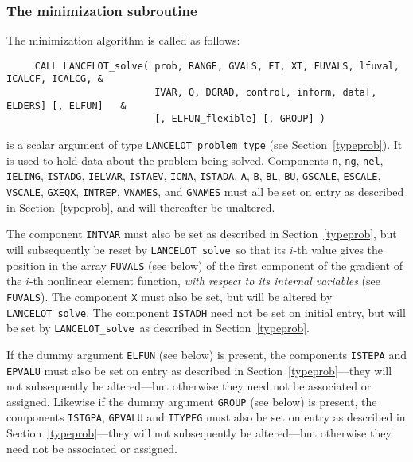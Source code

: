 \documentclass{galahad}
\newcommand{\fullpackagename}{LANC\-E\-LOT}
\newcommand{\solver}{{\tt \fullpackagename\_solve}}
\begin{document}

\subsubsection{The minimization subroutine\label{min}}
The minimization algorithm is called as follows:
\hskip0.5in
\def\baselinestretch{0.8} {\tt \begin{verbatim}
     CALL LANCELOT_solve( prob, RANGE, GVALS, FT, XT, FUVALS, lfuval, ICALCF, ICALCG, &
                          IVAR, Q, DGRAD, control, inform, data[, ELDERS] [, ELFUN]   &
                          [, ELFUN_flexible] [, GROUP] )
\end{verbatim}}
\def\baselinestretch{1.0}

\begin{description}

 is a scalar \intentinout argument of type
{\tt \fullpackagename\_problem\_type}
(see Section~\ref{typeprob}).
It is used to hold data about the problem being solved.
Components
{\tt n},
{\tt ng},
{\tt nel},
{\tt IELING},
{\tt ISTADG},
{\tt IELVAR},
{\tt ISTAEV},
{\tt ICNA},
{\tt ISTADA},
{\tt A},
{\tt B},
{\tt BL},
{\tt BU},
{\tt GSCALE},
{\tt ESCALE},
{\tt VSCALE},
{\tt GXEQX},
{\tt INTREP},
{\tt VNAMES}, and
{\tt GNAMES}
must all be set on entry as described in Section~\ref{typeprob}, and
will thereafter be unaltered.

The component {\tt INTVAR} must also be set as
described in Section~\ref{typeprob}, but will subsequently be reset by \solver\
so that its $i$-th value
gives the position in the array {\tt FUVALS} (see below)
of the first component of
the gradient of the $i$-th nonlinear element function, {\em with respect
to its internal variables} (see {\tt FUVALS}).
The component {\tt X} must also be set, but will be altered by \solver.
The component {\tt ISTADH} need not be set on initial entry, but will
be set by \solver\ as described in Section~\ref{typeprob}.

If the dummy argument {\tt ELFUN} (see below) is present,
the components {\tt ISTEPA} and {\tt EPVALU} must also be
set on entry as described in Section~\ref{typeprob}---they will
not subsequently be altered---but otherwise they need not be
associated or assigned.
Likewise if the dummy argument {\tt GROUP} (see below) is present,
the components {\tt ISTGPA}, {\tt GPVALU} and {\tt ITYPEG} must also be
set on entry as described in Section~\ref{typeprob}---they will
not subsequently be altered---but otherwise they need not be
associated or assigned.


\end{description}
\end{document}
